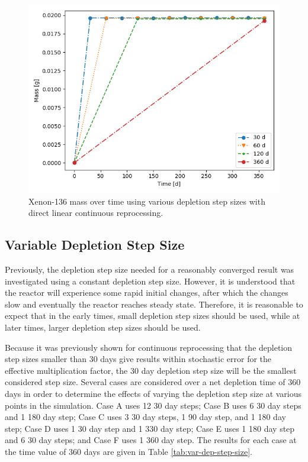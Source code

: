 \begin{figure}[H]
  \centering
  \includegraphics[scale=0.7]{images/DL_NSTEP_Xe-136_mass-large.png}
  \caption{Xenon-136 mass over time using various depletion step sizes with direct linear continuous reprocessing.}
   \label{fig:DL-cont-xe136-2}
\end{figure}


\subsection{Variable Depletion Step Size}

Previously, the depletion step size needed for a reasonably converged result was investigated using a constant depletion step size. However, it is understood that the reactor will experience some rapid initial changes, after which the changes slow and eventually the reactor reaches steady state. Therefore, it is reasonable to expect that in the early times, small depletion step sizes should be used, while at later times, larger depletion step sizes should be used.

Because it was previously shown for continuous reprocessing that the depletion step sizes smaller than 30 days give results within stochastic error for the effective multiplication factor, the 30 day depletion step size will be the smallest considered step size. Several cases are considered over a net depletion time of 360 days in order to determine the effects of varying the depletion step size at various points in the simulation. Case A uses 12 30 day steps; Case B uses 6 30 day steps and 1 180 day step; Case C uses 3 30 day steps, 1 90 day step, and 1 180 day step; Case D uses 1 30 day step and 1 330 day step; Case E uses 1 180 day step and 6 30 day steps; and Case F uses 1 360 day step. The results for each case at the time value of 360 days are given in Table \ref{tab:var-dep-step-size}.


